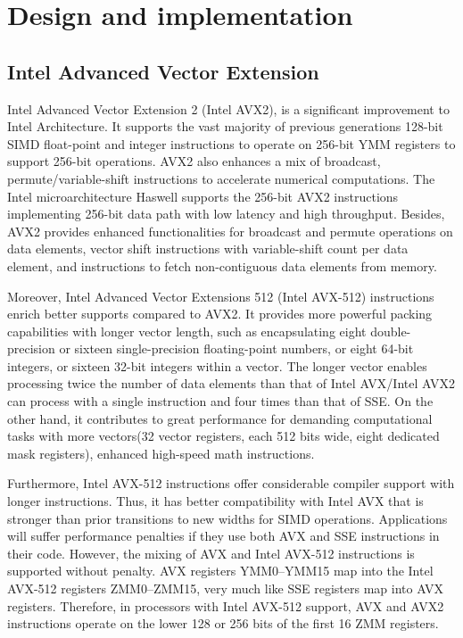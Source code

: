 \documentclass[5p,times,twocolumn]{elsarticle}
\begin{document}
\section{Design and implementation}\label{sec:design}
\subsection{Intel Advanced Vector Extension}
Intel Advanced Vector Extension 2 (Intel AVX2), is a significant improvement to Intel Architecture.
It supports the vast majority of previous generations 128-bit SIMD float-point
and integer instructions to operate on 256-bit YMM registers to support 256-bit operations.
%
AVX2 also enhances a mix of broadcast, permute/variable-shift instructions to accelerate
numerical computations. The Intel microarchitecture Haswell supports the 256-bit AVX2 instructions
implementing 256-bit data path with low latency and high throughput.
Besides, AVX2 provides enhanced functionalities for broadcast and permute operations on data elements,
vector shift instructions with variable-shift count per data element,
and instructions to fetch non-contiguous data elements from memory.

Moreover, Intel Advanced Vector Extensions 512 (Intel AVX-512) instructions
enrich better supports compared to AVX2. It provides more powerful packing
capabilities with longer vector length, such as encapsulating eight double-precision
or sixteen single-precision floating-point numbers,
or eight 64-bit integers, or sixteen 32-bit integers within a vector.
The longer vector enables processing twice the number of data elements
than that of Intel AVX/Intel AVX2 can
process with a single instruction and four times than that of SSE.
On the other hand, it contributes to great performance for
demanding computational tasks with more vectors(32 vector registers, each 512 bits wide,
eight dedicated mask registers), enhanced high-speed math instructions.

Furthermore, Intel AVX-512 instructions offer considerable compiler
support with longer instructions.
Thus, it has better compatibility with Intel AVX that is stronger than
prior transitions to new widths for SIMD operations.
Applications will suffer performance penalties if they use both AVX and SSE instructions in their code.
However, the mixing of AVX and Intel AVX-512 instructions is supported without penalty.
AVX registers YMM0--YMM15 map into the Intel AVX-512 registers
ZMM0--ZMM15, very much like SSE registers map into AVX registers. Therefore, in processors with
Intel AVX-512 support, AVX and AVX2 instructions operate on the lower 128 or 256 bits of the first 16 ZMM registers.
\end{document}
